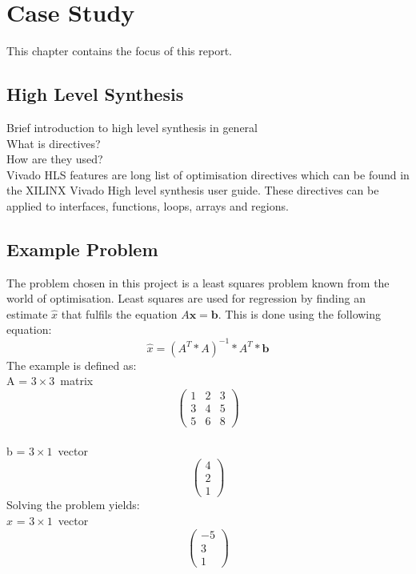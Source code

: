 \chapter{Case Study}
This chapter contains the focus of this report.

\section{High Level Synthesis}
Brief introduction to high level synthesis in general\\

What is directives?\\

How are they used?\\

Vivado HLS features are long list of optimisation directives which can be found in the XILINX Vivado High level synthesis user guide. These directives can be applied to interfaces, functions, loops, arrays and regions. 

\section{Example Problem}
\label{sec:example}
The problem chosen in this project is a least squares problem known from the world of optimisation. Least squares are used for regression by finding an estimate $\hat{x}$ that fulfils the equation $A\textbf{x} = \textbf{b}$. This is done using the following equation:
\begin{equation}
\label{leastsquares}
\hat{x} = (A^T * A)^{-1}*A^T*\textbf{b}
\end{equation}
The example is defined as:\\
A = $3 \times 3$~matrix
\[ \left( \begin{array}{ccc}
1 & 2 & 3 \\
3 & 4 & 5 \\
5 & 6 & 8 \end{array} \right)\] \\
b = $3 \times 1$~vector
\[ \left( \begin{array}{c}
4 \\
2 \\
1 \end{array} \right)\]
Solving the problem yields:\\
$\hat{x}$ = $3 \times 1$~vector
\[ \left( \begin{array}{c}
-5 \\
3 \\
1 \end{array} \right)\]

